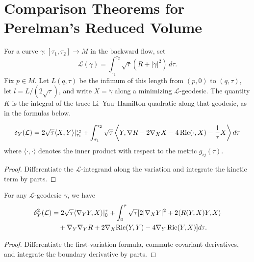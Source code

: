 \section{Comparison Theorems for Perelman's Reduced Volume}

For a curve $\gamma:[\tau_1,\tau_2]\to M$ in the backward flow, set
\[
\mathcal L(\gamma)=\int_{\tau_1}^{\tau_2}\sqrt\tau
(R+|\dot\gamma|^2)\,d\tau.
\]
Fix $p\in M$.  Let $L(q,\tau)$ be the infimum of this length from
$(p,0)$ to $(q,\tau)$, let $l=L/(2\sqrt\tau)$, and write $X=\dot\gamma$
along a minimizing $\mathcal L$-geodesic.  The quantity $K$ is the
integral of the trace Li--Yau--Hamilton quadratic along that geodesic,
as in the formulas below.

\begin{lemma}
  \label{lem:cz-first-variation-of-l-length}
$$
\delta_Y(\mathcal{L})=2\sqrt{\tau}\langle X,Y\rangle|_{\tau_1}^{\tau_2}
+\int_{\tau_1}^{\tau_2}\sqrt{\tau}\left\langle Y,\nabla
R-2\nabla_X X-4\operatorname{Ric}(\cdot,X)-\frac{1}{\tau}X\right\rangle d\tau
$$
where $\langle\cdot,\cdot\rangle$ denotes the inner product with respect to
the metric $g_{ij}(\tau)$.
\end{lemma}

\begin{proof}
  \sketch Differentiate the $\mathcal L$-integrand along the variation and integrate the kinetic term by parts.
\end{proof}

\begin{lemma}
  \label{lem:cz-second-variation-of-l-length}
For any $\mathcal{L}$-geodesic $\gamma$, we have
\begin{align*}
\delta_Y^2(\mathcal{L}) &
=2\sqrt{\tau}\langle\nabla_Y Y,X\rangle|_0^{\bar{\tau}}
+\int_0^{\bar{\tau}}\sqrt{\tau}[2|\nabla_XY|^2
+2\langle R(Y,X)Y,X\rangle\\
&\quad +\nabla_Y\nabla_YR+2\nabla_X{\operatorname{Ric}}(Y,Y)-4\nabla_Y
\operatorname{Ric}(Y,X)]d\tau.
\end{align*}
\end{lemma}

\begin{proof}
  \sketch Differentiate the first-variation formula, commute covariant derivatives, and integrate the boundary derivative by parts.
\end{proof}

